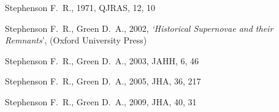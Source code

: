 \setlength{\bibsep}{0pt}            %
\renewcommand{\bibname}{References} %

\begin{thebibliography}{}

  Stephenson F.~R., 1971, QJRAS, 12, 10

  Stephenson F.~R., Green D.~A., 2002, \textit{`Historical Supernovae and
  their Remnants}', (Oxford University Press)

  Stephenson F.~R., Green D.~A., 2003, JAHH, 6, 46

  Stephenson F.~R., Green D.~A., 2005, JHA, 36, 217

  Stephenson F.~R., Green D.~A., 2009, JHA, 40, 31

\end{thebibliography}

%
%
%
%
%
%

\endinput
